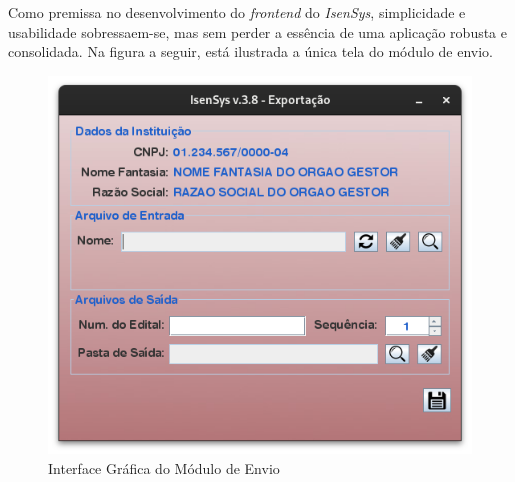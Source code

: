 \documentclass[
	12pt,			%
	openright,		%
	oneside,	
	a4paper,		%
	english,		%
	brazil			%
]{abntex2/abntex2}  %
\begin{document}
	Como premissa no desenvolvimento do \textit{frontend} do \textit{IsenSys}, simplicidade e usabilidade sobressaem-se, mas sem perder a essência de uma aplicação robusta e consolidada. Na figura a seguir, está ilustrada a única tela do módulo de envio.
	
	\begin{figure}[H]
		\begin{center}
			
			\caption{Interface Gráfica do Módulo de Envio}
			\label{envio-ui}
			
			\includegraphics[scale=0.5]{img/envio-ui}
			
		\end{center}
	\end{figure}
	
	

\postextual
{}


\end{document}
